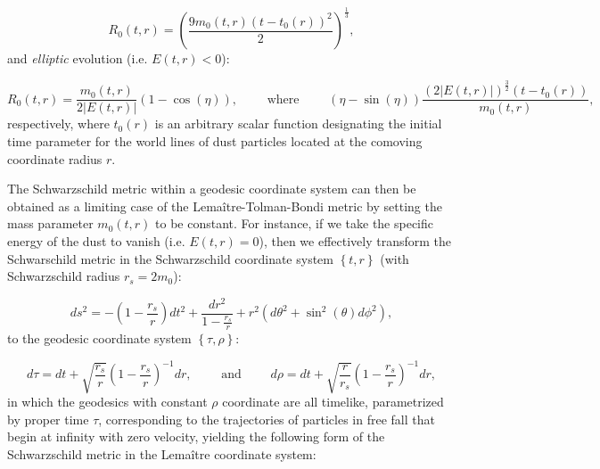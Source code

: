 \documentclass{article}
\begin{document}
\begin{equation}
R_0 \left( t, r \right) = \left( \frac{9 m_0 \left( t, r \right) \left( t - t_0 \left( r \right) \right)^2}{2} \right)^{\frac{1}{3}},
\end{equation}
and \textit{elliptic} evolution (i.e. ${E \left( t, r \right) < 0}$):

\begin{equation}
R_0 \left( t, r \right) = \frac{m_0 \left( t, r \right)}{2 \left\lvert E \left( t, r \right) \right\rvert} \left( 1 - \cos \left( \eta \right) \right), \qquad \text{ where } \qquad \left( \eta - \sin \left( \eta \right) \right) \frac{\left( 2 \left\lvert E \left( t, r \right) \right\rvert \right)^{\frac{3}{2}} \left( t - t_0 \left( r \right) \right)}{m_0 \left( t, r \right)},
\end{equation}
respectively, where ${t_0 \left( r \right)}$ is an arbitrary scalar function designating the initial time parameter for the world lines of dust particles located at the comoving coordinate radius $r$.

The Schwarzschild metric within a geodesic coordinate system can then be obtained as a limiting case of the Lema\^itre-Tolman-Bondi metric by setting the mass parameter ${m_0 \left( t, r \right)}$ to be constant. For instance, if we take the specific energy of the dust to vanish (i.e. ${E \left( t, r \right) = 0}$), then we effectively transform the Schwarschild metric in the Schwarzschild coordinate system ${\left\lbrace t, r \right\rbrace}$ (with Schwarzschild radius ${r_s = 2 m_0}$):

\begin{equation}
ds^2 = - \left( 1 - \frac{r_s}{r} \right) dt^2 + \frac{d r^2}{1 - \frac{r_s}{r}} + r^2 \left( d \theta^2 + \sin^2 \left( \theta \right) d \phi^2 \right),
\end{equation}
to the geodesic coordinate system ${\left\lbrace \tau, \rho \right\rbrace}$:

\begin{equation}
d \tau = dt + \sqrt{\frac{r_s}{r}} \left( 1 - \frac{r_s}{r} \right)^{-1} dr, \qquad \text{ and } \qquad d \rho = dt + \sqrt{\frac{r}{r_s}} \left( 1 - \frac{r_s}{r} \right)^{-1} dr,
\end{equation}
in which the geodesics with constant ${\rho}$ coordinate are all timelike, parametrized by proper time ${\tau}$, corresponding to the trajectories of particles in free fall that begin at infinity with zero velocity, yielding the following form of the Schwarzschild metric in the Lema\^itre coordinate system\cite{lemaitre}:
\end{document}

